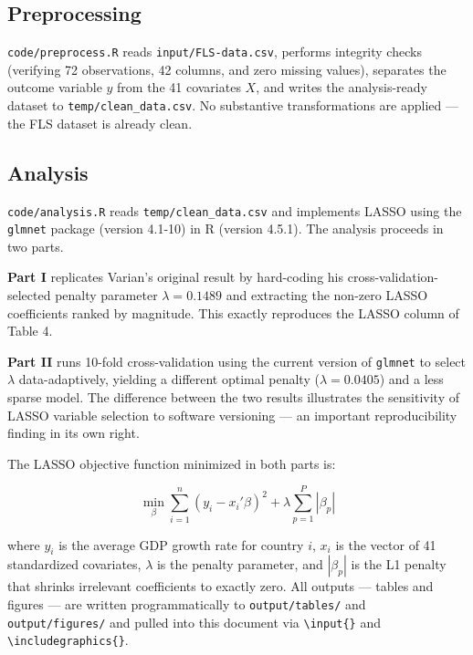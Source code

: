 \documentclass[12pt]{article}
\begin{document}
\subsection*{Preprocessing}

\texttt{code/preprocess.R} reads \texttt{input/FLS-data.csv}, performs
integrity checks (verifying 72 observations, 42 columns, and zero missing
values), separates the outcome variable $y$ from the 41 covariates $X$, and
writes the analysis-ready dataset to \texttt{temp/clean\_data.csv}. No
substantive transformations are applied --- the FLS dataset is already clean.

\subsection*{Analysis}

\texttt{code/analysis.R} reads \texttt{temp/clean\_data.csv} and implements
LASSO using the \texttt{glmnet} package (version 4.1-10) in R (version 4.5.1).
The analysis proceeds in two parts.

\textbf{Part I} replicates Varian's original result by hard-coding his
cross-validation-selected penalty parameter $\lambda = 0.1489$ and extracting
the non-zero LASSO coefficients ranked by magnitude. This exactly reproduces
the LASSO column of Table 4.

\textbf{Part II} runs 10-fold cross-validation using the current version of
\texttt{glmnet} to select $\lambda$ data-adaptively, yielding a different
optimal penalty ($\lambda = 0.0405$) and a less sparse model. The difference
between the two results illustrates the sensitivity of LASSO variable selection
to software versioning --- an important reproducibility finding in its own right.

The LASSO objective function minimized in both parts is:

\begin{equation}
\label{eq:lasso}
    \min_{\beta} \sum_{i=1}^{n} (y_i - x_i'\beta)^2 +
    \lambda \sum_{p=1}^{P} |\beta_p|
\end{equation}

where $y_i$ is the average GDP growth rate for country $i$, $x_i$ is the
vector of 41 standardized covariates, $\lambda$ is the penalty parameter, and
$|\beta_p|$ is the L1 penalty that shrinks irrelevant coefficients to exactly
zero. All outputs --- tables and figures --- are written programmatically to
\texttt{output/tables/} and \texttt{output/figures/} and pulled into this
document via \texttt{\textbackslash input\{\}} and
\texttt{\textbackslash includegraphics\{\}}.
\end{document}
